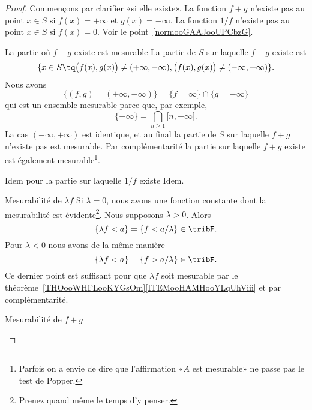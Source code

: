 \begin{proof}
    Commençons par clarifier «si elle existe». La fonction \( f+g\) n'existe pas au point \( x\in S\) si \( f(x)=+\infty\) et \( g(x)=-\infty\). La fonction \( 1/f\) n'existe pas au point \( x\in S\) si \( f(x)=0\). Voir le point~\ref{normooGAAJooUPCbzG}.
    \begin{subproof}
    \item[La partie où \( f+g\) existe est mesurable]
        La partie de \( S\) sur laquelle \( f+g\) existe est
        \begin{equation}
            \{ x\in S\tq \big( f(x),g(x) \big)\neq (+\infty,-\infty),\big( f(x),g(x) \big)\neq (-\infty,+\infty) \}.
        \end{equation}
        Nous avons
        \begin{equation}
            \{  (f,g)=(+\infty,-\infty) \}=\{ f=\infty \}\cap\{ g=-\infty \}
        \end{equation}
        qui est un ensemble mesurable parce que, par exemple,
        \begin{equation}
            \{ +\infty \}=\bigcap_{n\geq 1}\mathopen[ n , +\infty \mathclose].
        \end{equation}
        La cas \( (-\infty,+\infty)\) est identique, et au final la partie de \( S\) sur laquelle \( f+g\) n'existe pas est mesurable. Par complémentarité la partie sur laquelle \( f+g\) existe est également mesurable\footnote{Parfois on a envie de dire que l'affirmation «\( A\) est mesurable» ne passe pas le test de Popper.}.
    \item[Idem pour la partie sur laquelle \( 1/f\) existe]
        Idem.
    \item[Mesurabilité de \( \lambda f\)]
        Si \( \lambda=0\), nous avons une fonction constante dont la mesurabilité est évidente\footnote{Prenez quand même le temps d'y penser.}. Nous supposons \( \lambda>0\). Alors
        \begin{equation}
            \{ \lambda f<a \}=\{ f<a/\lambda \}\in \tribF.
        \end{equation}
        Pour \( \lambda<0\) nous avons de la même manière
        \begin{equation}
            \{ \lambda f<a \}=\{ f>a/\lambda \}\in \tribF.
        \end{equation}
        Ce dernier point est suffisant pour que \( \lambda f\) soit mesurable par le théorème~\ref{THOooWHFLooKYGsOm}\ref{ITEMooHAMHooYLqUhViii} et par complémentarité.
    \item[Mesurabilité de \( f+g\)]

\end{subproof}
\end{proof}
